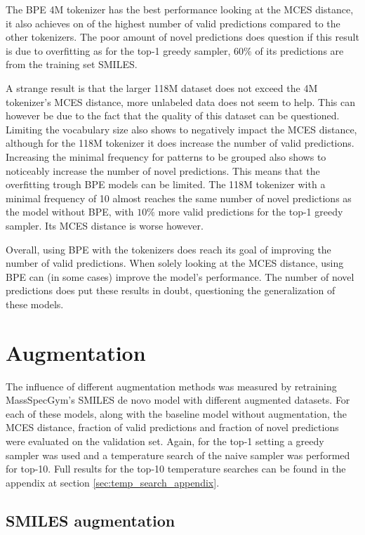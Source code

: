 The \ac{BPE} 4M tokenizer has the best performance looking at the MCES distance, it also achieves on of the highest number of valid predictions compared to the other tokenizers.
The poor amount of novel predictions does question if this result is due to overfitting as for the top-1 greedy sampler, $60\%$ of its predictions are from the training set SMILES.

A strange result is that the larger 118M dataset does not exceed the 4M tokenizer's MCES distance, more unlabeled data does not seem to help.
This can however be due to the fact that the quality of this dataset can be questioned.
Limiting the vocabulary size also shows to negatively impact the MCES distance, although for the 118M tokenizer it does increase the number of valid predictions.
Increasing the minimal frequency for patterns to be grouped also shows to noticeably increase the number of novel predictions.
This means that the overfitting trough \ac{BPE} models can be limited.
The 118M tokenizer with a minimal frequency of 10 almost reaches the same number of novel predictions as the model without \ac{BPE}, with $10\%$ more valid predictions for the top-1 greedy sampler.
Its MCES distance is worse however.

Overall, using \ac{BPE} with the tokenizers does reach its goal of improving the number of valid predictions.
When solely looking at the MCES distance, using \ac{BPE} can (in some cases) improve the model's performance.
The number of novel predictions does put these results in doubt, questioning the generalization of these models.

\section{Augmentation}

The influence of different augmentation methods was measured by retraining MassSpecGym's SMILES de novo model with different augmented datasets.
For each of these models, along with the baseline model without augmentation, the MCES distance, fraction of valid predictions and fraction of novel predictions were evaluated on the validation set.
Again, for the top-1 setting a greedy sampler was used and a temperature search of the naive sampler was performed for top-10.
Full results for the top-10 temperature searches can be found in the appendix at section \ref{sec:temp_search_appendix}.

\subsection{SMILES augmentation}

